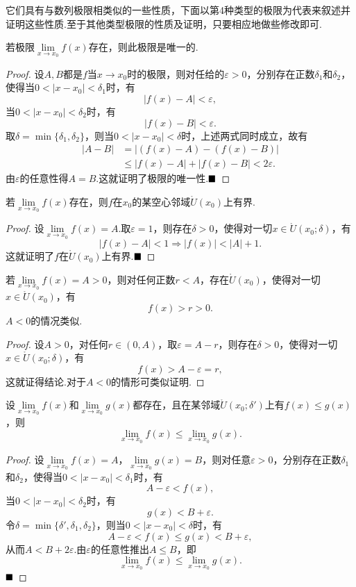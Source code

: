 它们具有与数列极限相类似的一些性质，下面以第4种类型的极限为代表来叙述并证明这些性质.至于其他类型极限的性质及证明，只要相应地做些修改即可.
\begin{theorem}[唯一性]
	若极限$\lim\limits_{x\to x_0}f(x)$存在，则此极限是唯一的.
\end{theorem}
\begin{proof}
	设$A,B$都是$f$当$x\to x_0$时的极限，则对任给的$\varepsilon>0$，分别存在正数$\delta_1$和$\delta_2$，使得当$0<|x-x_0|<\delta_1$时，有
	$$|f(x)-A|<\varepsilon,$$
	当$0<|x-x_0|<\delta_2$时，有
	$$|f(x)-B|<\varepsilon.$$
	取$\delta=\min\{\delta_1,\delta_2\}$，则当$0<|x-x_0|<\delta$时，上述两式同时成立，故有
	\begin{align*}
		|A-B|&=|(f(x)-A)-(f(x)-B)|\\
		&\leqslant|f(x)-A|+|f(x)-B|<2\varepsilon.
	\end{align*}
	由$\varepsilon$的任意性得$A=B$.这就证明了极限的唯一性.$\hfill\blacksquare$
\end{proof}
\begin{theorem}[局部有界性]
	若$\lim\limits_{x\to x_0}f(x)$存在，则$f$在$x_0$的某空心邻域$\mathring{U}(x_0)$上有界.
\end{theorem}
\begin{proof}
	设$\lim\limits_{x\to x_0}f(x)=A$.取$\varepsilon=1$，则存在$\delta>0$，使得对一切$x\in \mathring{U}(x_0;\delta)$，有
	$$|f(x)-A|<1\Rightarrow|f(x)|<|A|+1.$$
	这就证明了$f$在$\mathring{U}(x_0)$上有界.$\hfill\blacksquare$
\end{proof}
\begin{theorem}[局部保号性]
	若$\lim\limits_{x\to x_0}f(x)=A>0$，则对任何正数$r<A$，存在$\mathring{U}(x_0)$，使得对一切$x\in \mathring{U}(x_0)$，有
	$$f(x)>r>0.$$
	$A<0$的情况类似.
\end{theorem}
\begin{proof}
	设$A>0$，对任何$r\in (0,A)$，取$\varepsilon=A-r$，则存在$\delta>0$，使得对一切$x\in \mathring{U}(x_0;\delta)$，有
	$$f(x)>A-\varepsilon=r,$$
	这就证得结论.对于$A<0$的情形可类似证明.
\end{proof}
\begin{theorem}[保序性]
	设$\lim\limits_{x\to x_0}f(x)$和$\lim\limits_{x\to x_0}g(x)$都存在，且在某邻域$\mathring{U}(x_0;\delta')$上有$f(x)\leqslant g(x)$，则
	$$\lim\limits_{x\to x_0}f(x)\leqslant \lim\limits_{x\to x_0}g(x).$$
\end{theorem}
\begin{proof}
	设$\lim\limits_{x\to x_0}f(x)=A$，$\lim\limits_{x\to x_0}g(x)=B$，则对任意$\varepsilon>0$，分别存在正数$\delta_1$和$\delta_2$，使得当$0<|x-x_0|<\delta_1$时，有
	$$A-\varepsilon<f(x),$$
	当$0<|x-x_0|<\delta_2$时，有
	$$g(x)<B+\varepsilon.$$
	令$\delta=\min\{\delta',\delta_1,\delta_2\}$，则当$0<|x-x_0|<\delta$时，有
	$$A-\varepsilon<f(x)\leqslant g(x)<B+\varepsilon,$$
	从而$A<B+2\varepsilon$.由$\varepsilon$的任意性推出$A\leqslant B$，即
	$$\lim\limits_{x\to x_0}f(x)\leqslant \lim\limits_{x\to x_0}g(x).$$
	$\hfill\blacksquare$
\end{proof}
